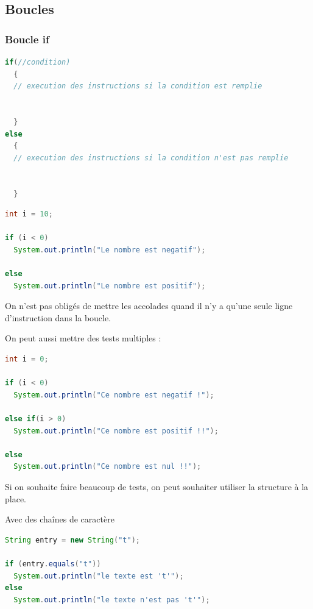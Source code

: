 \documentclass[a4paper,twoside]{article}
\begin{document}
\subsection{Boucles}
\subsubsection{Boucle if}
\begin{lstlisting}[language=java]
if(//condition)
  {
  // execution des instructions si la condition est remplie
  
  
  }
else
  {
  // execution des instructions si la condition n'est pas remplie
  
  
  }
\end{lstlisting}

\begin{exemple}
\begin{lstlisting}[language=java]
int i = 10;
 
if (i < 0)
  System.out.println("Le nombre est negatif");
 
else
  System.out.println("Le nombre est positif");
\end{lstlisting}
\end{exemple}

\begin{remarque}
On n'est pas obligés de mettre les accolades quand il n'y a qu'une seule ligne d'instruction dans la boucle.
\end{remarque}

\bigskip

On peut aussi mettre des tests multiples :
\begin{lstlisting}[language=java]
int i = 0;

if (i < 0)
  System.out.println("Ce nombre est negatif !");      

else if(i > 0)
  System.out.println("Ce nombre est positif !!");           

else  
  System.out.println("Ce nombre est nul !!");
\end{lstlisting}

Si on souhaite faire beaucoup de tests, on peut souhaiter utiliser la structure  à la place.

Avec des chaînes de caractère
\begin{lstlisting}[language=java]
String entry = new String("t");

if (entry.equals("t"))
  System.out.println("le texte est 't'");      
else  
  System.out.println("le texte n'est pas 't'");
\end{lstlisting}
\end{document}
